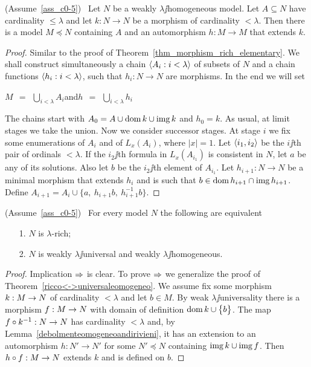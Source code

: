 \documentclass[creche.tex]{subfiles}
\begin{document}
\begin{lemma}\label{debolmenteomogeneoandirivieni}
(Assume~\ref{ass_c0-5})  \  Let $N$ be a weakly $\lambda\jj$ho\-mo\-ge\-ne\-ous model. Let $A\subseteq N$ have cardinality $\le\lambda$ and let $k:N\to N$ be a morphism of cardinality $<\lambda$. Then there is a model  $M\preceq N$ containing $A$ and an automorphism $h:M\to M$ that extends $k$.
\end{lemma}

\begin{proof}
Similar to the proof of Theorem~\ref{thm_morphism_rich_elementary}. We shall construct simultaneously a chain $\langle A_i:i<\lambda\rangle$ of subsets of $N$ and a chain functions $\langle h_i:i<\lambda\rangle$, such that $h_i:N\to N$ are morphisms. In the end we will set

\hfil $\displaystyle M\ \ =\ \ \bigcup_{i<\lambda}A_i$\hfil  and\hfil  $\displaystyle h\ \ =\ \ \bigcup_{i<\lambda}h_i$ 

The chains start with $A_0=A\cup\mathop{\rm dom} k\cup\mathop{\rm img} k$ and $h_0=k$. As usual, at limit stages we take the union. Now we consider successor stages. At stage $i$ we fix some enumerations of $A_i$ and of $L_x(A_i)$, where $|x|=1$. Let $\langle i_1,i_2\rangle$ be the $i\jj$th pair of ordinals $<\lambda$. If the $i_2\jj$th formula in $L_x(A_{i_1})$ is consistent in $N$, let $a$ be any of its solutions. Also let $b$ be the $i_2\jj$th element of $A_{i_1}$. Let $h_{i+1}:N\to N$ be a minimal morphism that extends $h_i$ and is such that $b\in\mathop{\rm dom} h_{i+1}\cap\mathop{\rm img} h_{i+1}$. Define $A_{i+1}=A_i\cup\big\{a,\ h_{i+1}b,\  h_{i+1}^{-1}b\big\}$.
\end{proof}



\begin{theorem}\label{ricco=universaledebolmenteomogeneo}
(Assume~\ref{ass_c0-5})  \  For every model $N$ the following are equivalent
\begin{itemize}
\item[1.] $N$ is $\lambda$-rich;
\item[2.] $N$ is  weakly $\lambda\jj$universal and weakly $\lambda\jj$homogeneous.
\end{itemize}
\end{theorem}

\begin{proof} 
Implication $\Rightarrow$ is clear. To prove $\Rightarrow$ we generalize the proof of Theorem~\ref{ricco<->universaleomogeneo}. We assume  fix some morphism $k:M\rightarrow N$ of cardinality $<\lambda$ and let $b\in M$. By weak $\lambda\jj$universality there is a morphism $f:M\rightarrow N$ with domain of definition $\mathop{\rm dom} k\cup\big\{b\big\}$. The map $f\circ k^{-1}:N\rightarrow N$ has cardinality $<\lambda$ and, by Lemma~\ref{debolmenteomogeneoandirivieni}, it has an extension to an automorphism $h:N'\to N'$ for some $N'\preceq N$ containing $\mathop{\rm img} k\cup\mathop{\rm img} f$. Then $h\circ f:M\rightarrow N$ extends $k$ and is defined on $b$.
\end{proof}
\end{document}
